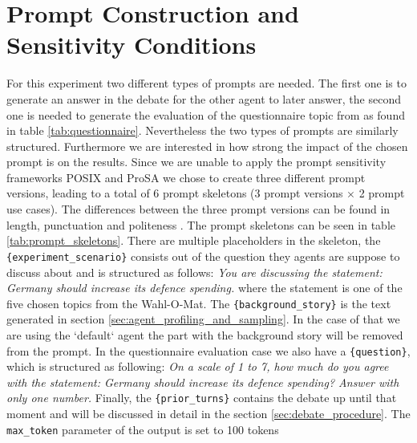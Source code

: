 


\section{Prompt Construction and Sensitivity 
Conditions}

For this experiment two different types of prompts are needed. The first one is to generate an answer in the debate for the other agent to later answer, the second one is needed to generate the evaluation of the questionnaire topic from as found in table \ref{tab:questionnaire}. Nevertheless the two types of prompts are similarly structured. Furthermore we are interested in how strong the impact of the chosen prompt is on the results. Since we are unable to apply the prompt sensitivity frameworks POSIX \citep{chatterjee2024posix} and ProSA \citep{zhuo2024prosa} we chose to create three different prompt versions, leading to a total of 6 prompt skeletons (3 prompt versions $\times$ 2 prompt use cases). The differences between the three prompt versions can be found in length, punctuation \cite{sclar2023quantifying} and politeness \cite{yin2024should}. The prompt skeletons can be seen in table \ref{tab:prompt_skeletons}. There are multiple placeholders in the skeleton, the \texttt{\{experiment\_scenario\}} consists out of the question they agents are suppose to discuss about and is structured as follows: \textit{You are discussing the statement: Germany should increase its defence spending.} where the statement is one of the five chosen topics from the Wahl-O-Mat. The \texttt{\{background\_story\}} is the text generated in section \ref{sec:agent_profiling_and_sampling}. In the case of that we are using the `default` agent the part with the background story will be removed from the prompt. In the questionnaire evaluation case we also have a \texttt{\{question\}}, which is structured as following: \textit{On a scale of 1 to 7, how much do you agree with the statement: Germany should increase its defence spending? Answer with only one number.} Finally, the \texttt{\{prior\_turns\}} contains the debate up until that moment and will be discussed in detail in the section \ref{sec:debate_procedure}. The \texttt{max\_token} parameter of the output is set to 100 tokens




